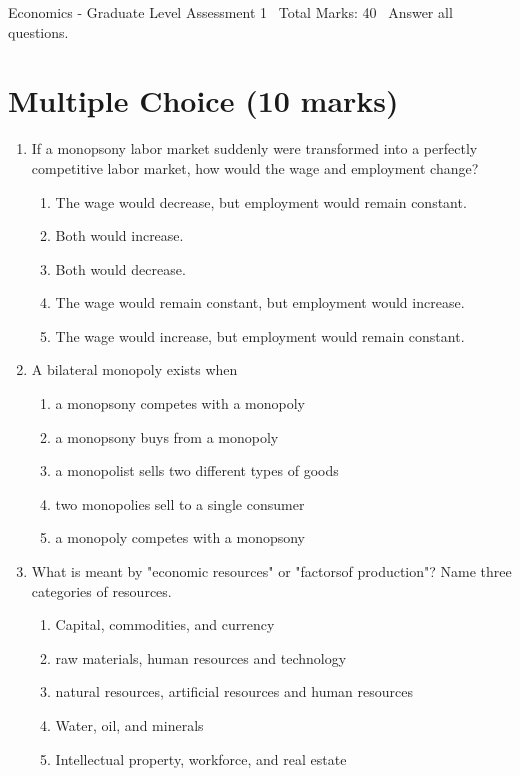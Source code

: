 \documentclass[12pt]{article}
\begin{document}
\begin{center}
Economics - Graduate Level Assessment 1 \
Total Marks: 40 \
Answer all questions.
\end{center}

\section*{Multiple Choice (10 marks)}
\begin{enumerate}[label=\arabic*.]
\item If a monopsony labor market suddenly were transformed into a perfectly competitive labor
market, how would the wage and employment change?
\begin{enumerate}[label=(\alph*)]
    \item The wage would decrease, but employment would remain constant.
    \item Both would increase.
    \item Both would decrease.
    \item The wage would remain constant, but employment would increase.
    \item The wage would increase, but employment would remain constant.
\end{enumerate}
\item A bilateral monopoly exists when
\begin{enumerate}[label=(\alph*)]
    \item a monopsony competes with a monopoly
    \item a monopsony buys from a monopoly
    \item a monopolist sells two different types of goods
    \item two monopolies sell to a single consumer
    \item a monopoly competes with a monopsony
\end{enumerate}
\item What is meant by "economic resources" or "factorsof production"? Name three categories of
resources.
\begin{enumerate}[label=(\alph*)]
    \item Capital, commodities, and currency
    \item raw materials, human resources and technology
    \item natural resources, artificial resources and human resources
    \item Water, oil, and minerals
    \item Intellectual property, workforce, and real estate

\end{enumerate}
\end{enumerate}
\end{document}
